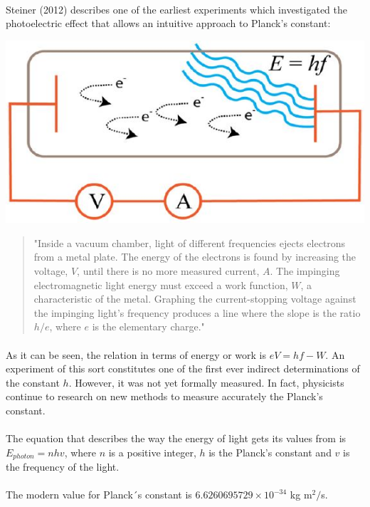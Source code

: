 \documentclass[letter]{article}
\begin{document}
\begin{enumerate}
    \paragraph{}Steiner (2012) describes one of the earliest experiments which investigated the photoelectric effect that allows an intuitive approach to Planck's constant:
    \vspace{1mm}
    \begin{center}
        \includegraphics[width=.5\textwidth]{experiment.JPG}
    \end{center}
    \vspace{1mm}
    \blockquote{"Inside a vacuum chamber, light of different frequencies ejects electrons from a metal plate. The energy of the electrons is found by increasing the voltage, $V$, until there is no more measured current, $A$. The impinging electromagnetic light energy must exceed a work function, $W$, a characteristic of the metal. Graphing the current-stopping voltage against the impinging light’s frequency produces a line where the slope is the ratio $h/e$, where $e$ is the elementary charge."\cite{Steiner, R. (2012)}}
    \paragraph{}As it can be seen, the relation in terms of energy or work is $eV = hf-W$. An experiment of this sort constitutes one of the first ever indirect determinations of the constant $h$. However, it was not yet formally measured. In fact, physicists continue to research on new methods to measure accurately the Planck's constant.
    \paragraph{}The equation that describes the way the energy of light gets its values from is $E_{photon} = nhv$, where $n$ is a positive integer, $h$ is the Planck's constant and $v$ is the frequency of the light.
    \paragraph{} The modern value for Planck´s constant is $6.6260695729 \times10^{-34}$ kg m$^2/$s. 
    \newpage


\end{enumerate}
\end{document}
